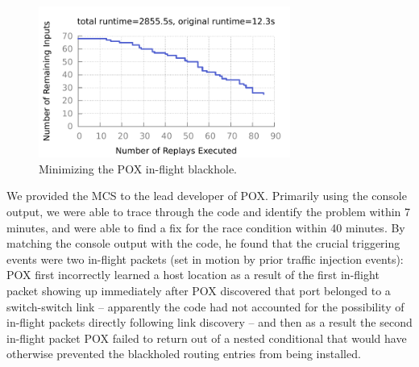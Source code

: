 \begin{figure}[t]
    \includegraphics[width=3.25in]{../graphs/runtime/pox_blackhole.pdf}
    \caption[]{\label{fig:pox_discovery} Minimizing the POX in-flight blackhole.}
\end{figure}

We provided the MCS to the lead developer of POX. Primarily using the
console output, we were able to trace through the code and identify the problem
within 7 minutes, and were able to find a fix for the race condition within 40
minutes. By matching the console output with the code, he found that the crucial
triggering events were two
in-flight packets (set in motion by prior traffic injection events):
POX first incorrectly learned a host location as a result of the first in-flight
packet showing up immediately after POX discovered that port belonged to
a switch-switch link -- apparently the code had not accounted for the
possibility of in-flight packets directly following link discovery -- and
then as a result the
second in-flight packet
POX failed to return out of a nested conditional that would have
otherwise prevented the blackholed routing entries from being installed.

